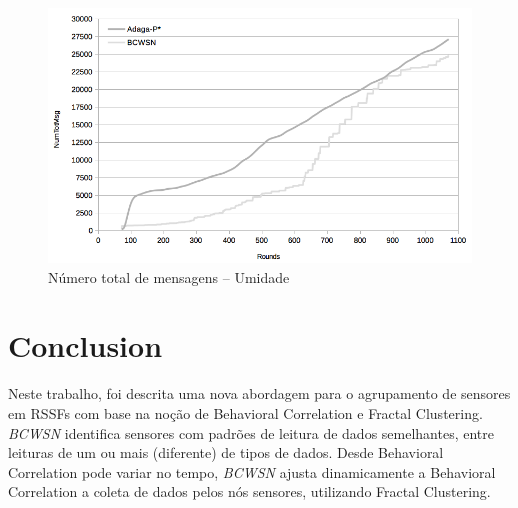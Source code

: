 \documentclass{acm_proc_article-sp}
\begin{document}
\begin{figure}[!htb]
\begin{center}
	\includegraphics[scale=0.3]{BCWSN-TotNumMsgxRound-PB-Hum.png}
	 \vspace*{-.6cm}
    \caption{Número total de mensagens – Umidade}
    \label{fig:tot-num-msg-hum}
\end{center}
\end{figure}

\section{Conclusion}
\label{conclusion}

Neste trabalho, foi descrita uma nova abordagem para o agrupamento
de sensores em RSSFs com base na noção de Behavioral Correlation e Fractal
Clustering. {\it BCWSN} identifica sensores com padrões de leitura 
de dados semelhantes, entre leituras de um ou mais (diferente) de tipos 
de dados. Desde Behavioral Correlation pode variar no tempo, {\it BCWSN} ajusta
dinamicamente a Behavioral Correlation a coleta de dados pelos nós sensores,
utilizando Fractal Clustering.
\vspace*{-.3cm}
\end{document}
